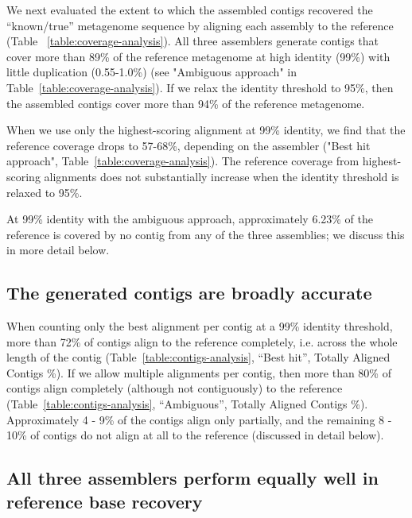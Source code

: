 \documentclass[10pt,a4paper,twocolumn]{article}
\begin{document}
We next evaluated the extent to which the assembled contigs recovered the
``known/true'' metagenome sequence by aligning each assembly to the
reference (Table ~\ref{table:coverage-analysis}).  All three
assemblers generate contigs that cover more than 89\% of the reference
metagenome at high identity (99\%) with little duplication
(0.55-1.0\%) (see "Ambiguous approach" in
Table~\ref{table:coverage-analysis}).  If we relax the identity
threshold to 95\%, then the assembled contigs cover more than 94\% of
the reference metagenome.


When we use only the highest-scoring alignment at 99\% identity, we
find that the reference coverage drops to 57-68\%, depending on the
assembler ("Best hit approach",
Table~\ref{table:coverage-analysis}). The reference coverage from
highest-scoring alignments does not substantially increase when the
identity threshold is relaxed to 95\%.

At 99\% identity with the ambiguous approach, approximately 6.23\% of
the reference is covered by no contig from any of the three
assemblies; we discuss this in more detail below.

\subsection*{The generated contigs are broadly accurate} 

When counting only the best alignment per contig at a 99\%
identity threshold, more than 72\% of contigs align to the reference
completely, i.e. across the whole length of the contig (Table~\ref{table:contigs-analysis}, ``Best hit'', Totally Aligned Contigs \%).  If we allow
multiple alignments per contig, then more than 80\% of contigs align
completely (although not contiguously) to the reference (Table~\ref{table:contigs-analysis}, ``Ambiguous'', Totally Aligned Contigs \%).
Approximately 4 - 9\% of the contigs align only partially, and the
remaining 8 - 10\% of contigs do not align at all to the reference
(discussed in detail below).

\subsection*{All three assemblers perform equally well in reference base recovery}
\end{document}
